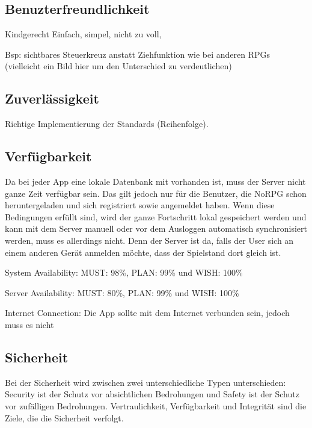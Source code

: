 {	\subsection{Benuzterfreundlichkeit}
		Kindgerecht
		Einfach, simpel, nicht zu voll,
		
		Bsp: sichtbares Steuerkreuz anstatt Ziehfunktion wie bei anderen RPGs (vielleicht ein Bild hier um den Unterschied zu verdeutlichen)

	\subsection{Zuverlässigkeit}
		
		Richtige Implementierung der Standards (Reihenfolge). 
	
	\subsection{Verfügbarkeit}
		
		Da bei jeder App eine lokale Datenbank mit vorhanden ist, muss der Server nicht ganze Zeit verfügbar sein. Das gilt jedoch nur für die Benutzer, die NoRPG schon heruntergeladen und sich registriert sowie angemeldet haben. Wenn diese Bedingungen erfüllt sind, wird der ganze Fortschritt lokal gespeichert werden und kann mit dem Server manuell oder vor dem Ausloggen automatisch synchronisiert werden, muss es allerdings nicht. Denn der Server ist da, falls der User sich an einem anderen Gerät anmelden möchte, dass der Spielstand dort gleich ist. 
		
		System Availability: MUST: 98\%, PLAN: 99\% und WISH: 100\%
		
		Server Availability: MUST: 80\%, PLAN: 99\% und WISH: 100\%
		
		Internet Connection: Die App sollte mit dem Internet verbunden sein, jedoch muss es nicht
		
	\subsection{Sicherheit}
		Bei der Sicherheit wird zwischen zwei unterschiedliche Typen unterschieden: Security ist der Schutz vor absichtlichen Bedrohungen und Safety ist der Schutz vor zufälligen Bedrohungen. Vertraulichkeit, Verfügbarkeit und Integrität sind die Ziele, die die Sicherheit verfolgt.
		
}
